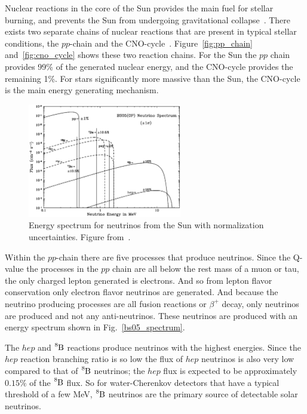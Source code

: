 Nuclear reactions in the core of the Sun provides the main fuel for
stellar burning, and prevents the Sun from undergoing gravitational
collapse~\cite{XXX}. %
There exists two separate chains of nuclear reactions that are present in typical
stellar conditions, the $pp$-chain and the CNO-cycle~\cite{bahcall_solar_neutrinos_theory}.
Figure~\ref{fig:pp_chain} and~\ref{fig:cno_cycle} shows these two reaction chains.
For the Sun the $pp$ chain
provides 99\% of the generated nuclear energy, and the CNO-cycle provides the remaining
1\%. For stars significantly more massive than the Sun, the CNO-cycle is the
main energy generating mechanism.

\begin{figure}[htbp]
\centering
\includegraphics[width=0.6\textwidth]{bs05op_spectrum}
\caption[Solar Neutrino Spectrum]{Energy spectrum for neutrinos from
the Sun with normalization uncertainties. Figure from~\cite{bs_ssm}.}
\label{fig:bs05_spectrum}
\end{figure}

Within the $pp$-chain there are five processes that produce neutrinos.
Since the Q-value the processes in the $pp$ chain are all below the rest mass
of a muon or tau, the only charged lepton generated is electrons. And so from
lepton flavor conservation only electron flavor neutrinos are generated.
And because the neutrino producing processes are all fusion reactions or
$\beta^{+}$ decay, only neutrinos are produced and not any anti-neutrinos.
These neutrinos are produced with an energy spectrum shown in Fig.~\ref{bs05_spectrum}.

The $hep$ and $\ce{^{8}B}$ reactions produce neutrinos with the highest
energies. Since the $hep$ reaction branching ratio is so low the flux
of $hep$ neutrinos is also very low compared to that of $\ce{^{8}B}$ neutrinos;
the $hep$ flux is expected to be approximately $0.15\%$ of the $\ce{^{8}B}$ flux.
So for water-Cherenkov detectors that have a typical threshold of a few MeV, $\ce{^{8}B}$ neutrinos
are the primary source of detectable solar neutrinos.

